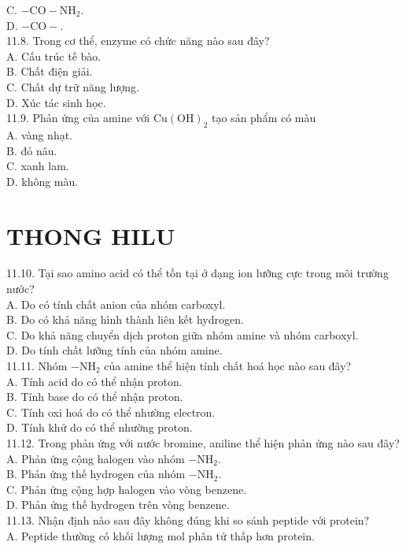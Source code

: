 \documentclass[10pt]{article}
\begin{document}
C. $-\mathrm{CO}-\mathrm{NH}_{2}$.\\
D. $-\mathrm{CO}-$.\\
11.8. Trong cơ thể, enzyme có chức năng nào sau đây?\\
A. Cấu trúc tế bào.\\
B. Chất điện giải.\\
C. Chất dự trữ năng lượng.\\
D. Xúc tác sinh học.\\
11.9. Phản ứng của amine với $\mathrm{Cu}(\mathrm{OH})_{2}$ tạo sản phẩm có màu\\
A. vàng nhạt.\\
B. đỏ nâu.\\
C. xanh lam.\\
D. không màu.

\section*{THONG HILU}
11.10. Tại sao amino acid có thể tồn tại ở dạng ion lưỡng cực trong môi trường nước?\\
A. Do có tính chất anion của nhóm carboxyl.\\
B. Do có khả năng hình thành liên kết hydrogen.\\
C. Do khả năng chuyển dịch proton giữa nhóm amine và nhóm carboxyl.\\
D. Do tính chất lưỡng tính của nhóm amine.\\
11.11. Nhóm $-\mathrm{NH}_{2}$ của amine thể hiện tính chất hoá học nào sau đây?\\
A. Tính acid do có thể nhận proton.\\
B. Tính base do có thể nhận proton.\\
C. Tính oxi hoá do có thể nhường electron.\\
D. Tính khử do có thể nhường proton.\\
11.12. Trong phản ứng với nước bromine, aniline thể hiện phản ứng nào sau đây?\\
A. Phản ứng cộng halogen vào nhóm $-\mathrm{NH}_{2}$.\\
B. Phản ứng thế hydrogen của nhóm $-\mathrm{NH}_{2}$.\\
C. Phản ứng cộng hợp halogen vào vòng benzene.\\
D. Phản ứng thế hydrogen trên vòng benzene.\\
11.13. Nhận định nào sau đây không đúng khi so sánh peptide với protein?\\
A. Peptide thường có khối lượng mol phân tử thấp hơn protein.\\
\end{document}
